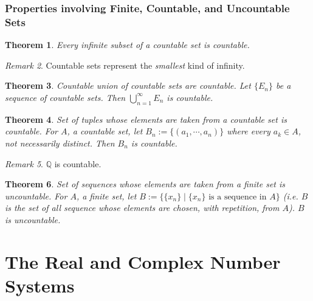 \documentclass[a4paper,12pt]{report}
\newcommand{\Q}{\mathbb{Q}}
\theoremstyle{plain}
\newtheorem{theorem}{\color{blue}Theorem}[chapter] %
\theoremstyle{definition}
\theoremstyle{remark}
\newtheorem{remark}[theorem]{\color{ForestGreen}Remark} %
\begin{document}
\subsection{Properties involving Finite, Countable, and Uncountable Sets}
\begin{theorem}
Every infinite subset of a countable set is countable.
\end{theorem}
\begin{remark}
Countable sets represent the \emph{smallest} kind of infinity.
\end{remark}
\begin{theorem}
Countable union of countable sets are countable. Let $\{E_n\}$ be a sequence of countable sets. Then $\bigcup_{n=1}^\infty E_n$ is countable.
\end{theorem}
\begin{theorem}
Set of tuples whose elements are taken from a countable set is countable. For $A$, a countable set, let $B_n:= \{(a_1,\cdots,a_n)\}$ where every $a_k\in A$, not necessarily distinct. Then $B_n$ is countable.
\end{theorem}
\begin{remark}
$\Q$ is countable.
\end{remark}
\begin{theorem}
Set of sequences whose elements are taken from a finite set is uncountable. For $A$, a finite set, let $B:= \{\{x_n\}\mid \{x_n\}\text{ is a sequence in } A\}$ (i.e. $B$ is the set of all sequence whose elements are chosen, with repetition, from $A$). $B$ is uncountable.
\end{theorem}

\chapter{The Real and Complex Number Systems}
\end{document}
